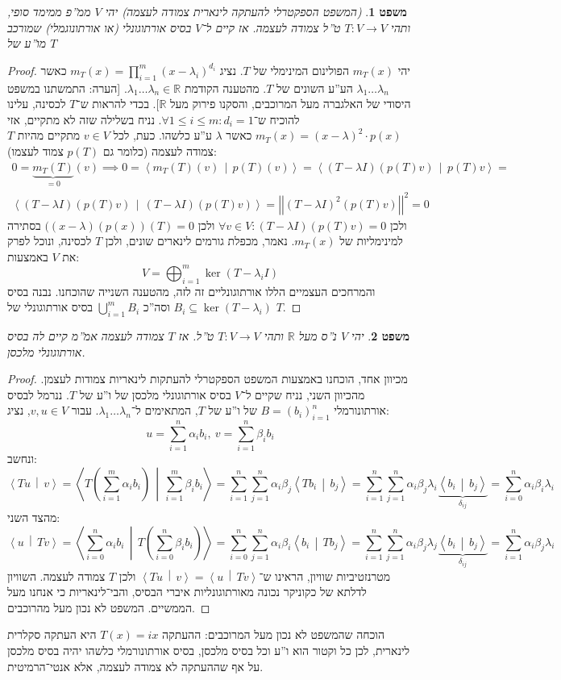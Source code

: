 \documentclass[]{article}
\newcommand\R     {\mathbb{R}}
\newcommand\ra    {\rangle}
\newcommand\la    {\langle}
\newcommand\sumni     {\sum_{i = 0}^{n}}
\newcommand\co        {\colon}
\newcommand\norm[1]   {\left \vert \left \vert #1 \right \vert \right \vert}
\newcommand\mut[2]    {\left \la #1 \,\middle\vert\, #2 \right \ra}
\newcommand\ag        {\alpha}
\newcommand\bg        {\beta}
\newcommand\dg        {\delta}
\renewcommand\lg      {\lambda}
\newcommand\cl [1]    {\left ( #1 \right )}
\newtheorem{Theorem}{משפט}
\theoremstyle{definition}
\newcommand\theo  [1] {\begin{Theorem}#1\end{Theorem}}
\begin{document}
	\theo{(המשפט הספקטרלי להעתקה לינארית צמודה לעצמה) יהי $V$ ממ''פ ממימד סופי, ותהי $T \co V \to V$ ט''ל צמודה לעצמה. אז קיים ל־$V$ בסיס אורתוגונלי (או אורתונוגמלי) שמורכב מו''ע של $T$} \begin{proof}
		יהי $m_T(x)$ הפולינום המינימלי של $T$. נציג $m_T(x) = \prod_{i = 1}^{m}(x - \lg_i)^{d_i}$ כאשר $\lg_1 \dots \lg_n$ הע''ע השונים של $T$. מהטענה הקודמת $\lg_1 \dots \lg_n \in \R$. [הערה: התמשתנו במשפט היסודי של האלגברה מעל המרוכבים, והסקנו פירוק מעל $\R$]. בכדי להראות ש־$T$ לכסינה, עלינו להוכיח ש־$\forall 1 \le i \le m \co d_i = 1$. נניח בשלילה שזה לא מתקיים, אזי $m_T(x) = (x - \lg)^2 \cdot p(x)$ כאשר $\lg$ ע''ע כלשהו. כעת, לכל $v \in V$ מתקיים מהיות $T$ צמודה לעצמה (כלומר גם $p(T)$ צמוד לעצמו): 
		\begin{multline*}
			0 = \underbrace{m_T(T)}_{=0}(v) \implies 0 = \mut{m_T(T)(v)}{p(T)(v)} = \mut{(T - \lg I)(p(T)v)}{p(T)v} =\\ \mut{(T - \lg I)(p(T)v)}{(T - \lg I)(p(T)v)} = \norm{(T - \lg I)^2(p(T)v)}^2 = 0
		\end{multline*}
		ולכן $\forall v \in V \co (T - \lg I)(p(T)v) = 0$ ולכן $((x - \lg)(p(x))(T) = 0$ בסתירה למינימליות של $m_T(x)$. נאמר, מכפלת גורמים לינארים שונים, ולכן $T$ לכסינה, ונוכל לפרק את $V$ באמצעות: 
		\[ V = \bigoplus_{i = 1}^{m} \ker (T - \lg_i I) \]
		והמרחכים העצמיים הללו אורתוגונליים זה לזה, מהטענה השנייה שהוכחנו. 
		נבנה בסיס $B_i \subseteq \ker (T - \lg_i)$ וסה''כ $\bigcup_{i = 1}^{m} B_i$ בסיס אורתוגונלי של $T$. 
	\end{proof}
	\theo{יהי $V$ נ''ס מעל $\R$ ותהי $T \co V \to V$ ט''ל. אז $T$ צמודה לעצמה אמ''מ קיים לה בסיס אורתוגונלי מלכסן. }\begin{proof}
		מכיוון אחד, הוכחנו באמצעות המשפט הספקטרלי להעתקות לינאריות צמודות לעצמן. 
		מהכיוון השני, נניח שקיים ל־$V$ בסיס אורתוגונלי מלכסן של ו''ע של $T$. ננרמל לבסיס אורתונורמלי $B = (b_i)_{i = 1}^{n}$ של ו''ע של $T$, המתאימים ל־$\lg_1 \dots \lg_n$. עבור $v, u \in V$, נציג: 
		\[ u = \sum_{i = 1}^{n}\ag_i b_i, \ v = \sum_{i = 1}^{n}\bg_i b_i \]
		ונחשב: 
		\[ \mut{Tu}{v} = \mut{T\cl{\sum_{i = 1}^{m}\ag_i b_i}}{\sum_{i = 1}^{m}\bg_i b_i} = \sum_{i = 1}^{n}\sum_{j = 1}^{n}\ag_i \bg_j \mut{T b_i}{b_j} = \sum_{i = 1}^{n}\sum_{j = 1}^{n}\ag_i \bg_j \lg_i \underbrace{\mut{b_i}{b_j}}_{\dg_{ij}} = \sumni \ag_i \bg_i \lg_i \]
		מהצד השני: 
		\[ \mut{u}{Tv} = \mut{\sumni \ag_i b_i}{T\cl{\sumni \bg_i b_i}} = \sumni \sum_{j = 1}^{n}\ag_i \bg_i \mut{b_i}{Tb_j} = \sum_{i = 1}^{n}\sum_{j = 1}^{n}\ag_i \bg_j \lg_j \underbrace{\mut{b_i}{b_j}}_{\dg_{ij}} = \sum_{i = 1}^{n}\ag_i \bg_j \lg_i \]
		מטרנזטיביות שוויון, הראינו ש־$\mut{Tu}{v} = \mut{u}{Tv}$ ולכן $T$ צמודה לעצמה. השוויון לדלתא של כקוניקר נכונה מאורתוגונליות איברי הבסיס, והבי־לינאריות כי אנחנו מעל הממשיים. המשפט לא נכון מעל מהרוכבים. 
	\end{proof}
	הוכחה שהמשפט לא נכון מעל המרוכבים: ההעתקה $T(x) = ix$ היא העתקה סקלרית לינארית, לכן כל וקטור הוא ו''ע וכל בסיס מלכסן, בסיס אורתונורמלי כלשהו יהיה בסיס מלכסן על אף שההעתקה לא צמודה לעצמה, אלא אנטי־הרמיטית. 
	
\end{document}
